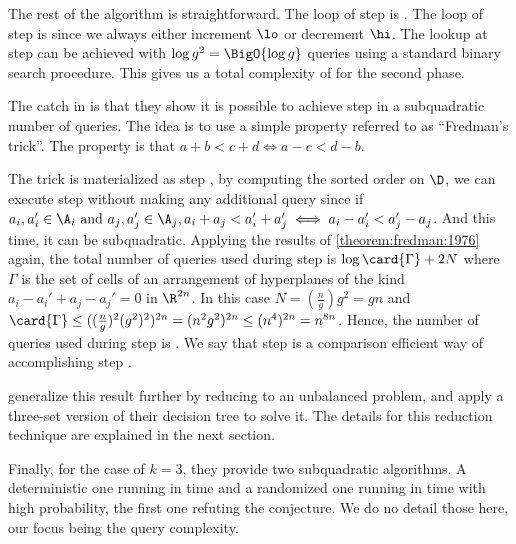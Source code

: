 The rest of the algorithm is straightforward. The loop of step  is
. The loop of step  is  since we
always either increment $\lo$ or decrement $\hi$. The lookup at step
 can be achieved with $\log g^2 = \BigO{\log g}$ queries using
a standard binary search procedure. This gives us a total complexity of
 for the second phase.

The catch in \citet*{gronlund:2014} is that they show it is possible to
achieve step  in a subquadratic number of queries. The idea is to use a simple property referred to as ``Fredman's
trick''. The property is that $a + b < c + d \iff a - c < d - b$.

The trick is materialized as step , by computing the sorted
order on $\D$, we can execute step  without making any additional
query since if $a_i, a_i' \in \A_i \text{ and } a_j, a_j' \in \A_j, a_i + a_j <
a_i' + a_j' \iff a_i - a_i' < a_j' - a_j$. And this time, it can be
subquadratic. Applying the results of \ref{theorem:fredman:1976} again, the
total number of queries used during step  is $\log \card{\Gamma} + 2N$
where \(\Gamma\) is the set of cells of an arrangement of hyperplanes of the
kind \( a_i - a_i' + a_j - a_j' = 0 \) in \(\R^{2n}\).
In this case $N = (\frac{n}{g}) g^2 = gn$ and $\card{\Gamma} \le
((\frac{n}{g})^2 (g^2)^2)^{2n} = (n^2 g^2)^{2n} \le (n^4)^{2n} = n^{8n}$.
Hence, the number of queries used during step  is .
We say that step  is a comparison efficient way of accomplishing step
.

\citet*{gronlund:2014} generalize this result further by reducing \kLDT to an
unbalanced \threeSUM problem, and apply a three-set version of their decision
tree to solve it. The details for this reduction technique are explained in
the next section.

Finally, for the case of $k = 3$, they provide two subquadratic \threeSUM
algorithms. A deterministic one running in  time and a randomized one running in  time with high probability, the first one refuting the \threeSUM
conjecture. We do no detail those here, our focus being the query complexity.
